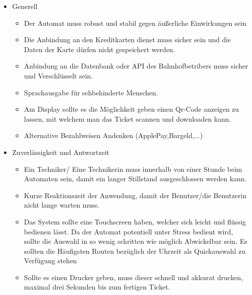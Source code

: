 \documentclass[12pt]{article}
\begin{document}
\begin{itemize}
 \item Generell
\begin{itemize}
  \item Der Automat muss robust und stabil gegen äußerliche Einwirkungen sein
  \item Die Anbindung an den Kreditkarten dienst muss sicher sein und die Daten der Karte dürfen nicht gespeichert werden.
  \item Anbindung an die Datenbank oder API des Bahnhofbetribers muss sicher und Verschlüsselt sein.
  \item Sprachausgabe für sehbehinderte Menschen.
  \item Am Display sollte es die Möglichkeit geben einen Qr-Code anzeigen zu lassen, mit welchem man das Ticket scannen und downloaden kann.
  \item Alternative Bezahlweisen Andenken (ApplePay,Bargeld,...)
\end{itemize}
 \item Zuverlässigkeit und Antwortzeit
\begin{itemize}
 \item Ein Techniker/ Eine Technikerin muss innerhalb von einer Stunde beim Automaten sein, damit ein langer Stillstand ausgeschlossen werden kann.
 \item Kurze Reaktionszeit der Anwendung, damit der Benutzer/die Benutzerin nicht lange warten muss.
 \item Das System sollte eine Touchscreen haben, welcher sich leicht und flüssig bedienen lässt. Da der Automat potentiell unter Stress bedient wird, sollte die Auswahl in so wenig schritten wie möglich Abwickelbar sein. Es sollten die Häufigsten Routen bezüglich der Uhrzeit als Quickauswahl zu Verfügung stehen
 \item Sollte es einen Drucker geben, muss dieser schnell und akkurat drucken, maximal drei Sekunden bis zum fertigen Ticket.
\end{itemize}
\end{itemize}
\end{document}
